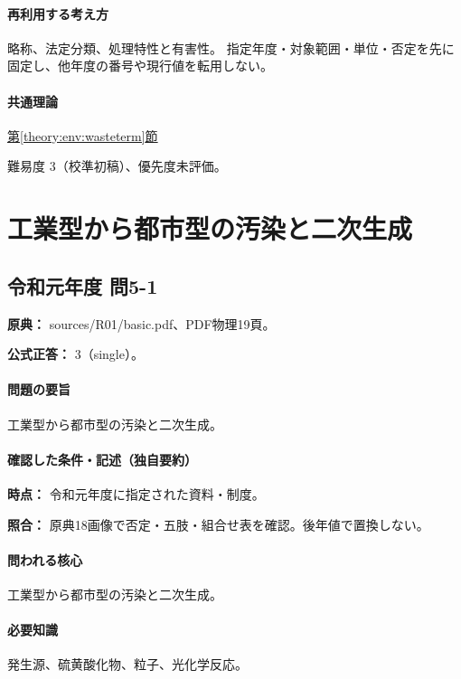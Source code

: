 \paragraph{再利用する考え方} 略称、法定分類、処理特性と有害性。 指定年度・対象範囲・単位・否定を先に固定し、他年度の番号や現行値を転用しない。

\paragraph{共通理論} \hyperref[theory:env:wasteterm]{第\ref*{theory:env:wasteterm}節}

\par 難易度 3（校準初稿）、優先度未評価。

\section{工業型から都市型の汚染と二次生成}

\subsection{令和元年度 問5-1}
\label{q:r01-reg-basic-5-1}

\noindent\textbf{原典：} sources/R01/basic.pdf、PDF物理19頁。

\textbf{公式正答：} 3（single）。

\paragraph{問題の要旨} 工業型から都市型の汚染と二次生成。

\paragraph{確認した条件・記述（独自要約）}\mbox{}\par

\noindent\textbf{時点：} 令和元年度に指定された資料・制度。\par

\noindent\textbf{照合：} 原典18画像で否定・五肢・組合せ表を確認。後年値で置換しない。\par

\paragraph{問われる核心} 工業型から都市型の汚染と二次生成。

\paragraph{必要知識} 発生源、硫黄酸化物、粒子、光化学反応。

